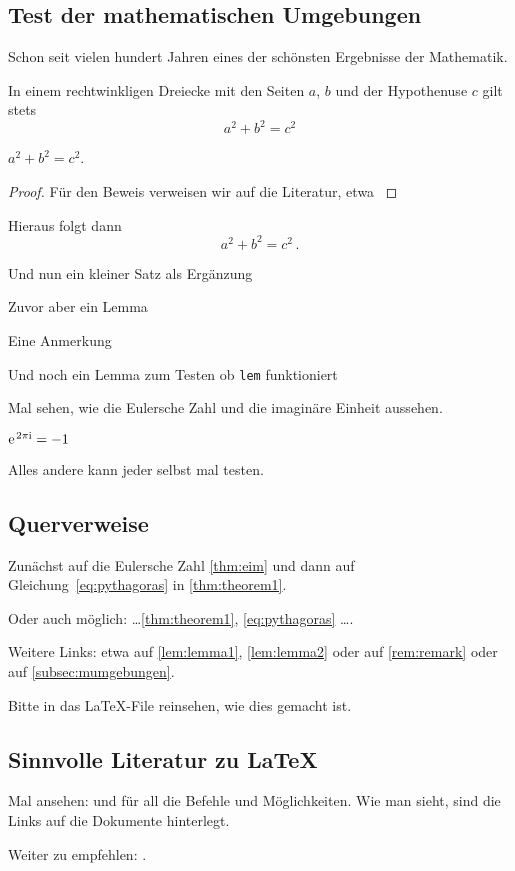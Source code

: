 \subsection{Test der mathematischen Umgebungen}\label{subsec:mumgebungen}
Schon seit vielen hundert Jahren eines der schönsten Ergebnisse der Mathematik.
%
\begin{theorem}\label{thm:theorem1}
In einem rechtwinkligen Dreiecke mit den Seiten $ a $, $ b $ und der Hypothenuse $ c $ gilt stets
\begin{equation}\label{eq:pythagoras}
a^{ 2 } +b^{ 2 } = c^{ 2 }
\end{equation}

$	a^{ 2 } +b^{ 2 } = c^{ 2 } $.
\end{theorem}
%
\begin{proof}
Für den Beweis verweisen wir auf die Literatur, etwa \textcite{efhn:2016}
\end{proof}
\begin{corollary}\label{cor:folgerung}
Hieraus folgt dann 
%
\[
	a^{ 2 } + b^{ 2 } = c^{ 2 } \, .
\]
%
\end{corollary}
%
\begin{proposition}\label{prop:prop}
Und nun ein kleiner Satz als Ergänzung 
\end{proposition}
%
\begin{lemma}\label{lem:lemma1}
Zuvor aber ein Lemma
\end{lemma}
%
\begin{remark}\label{rem:remark}
Eine Anmerkung
\end{remark}
\begin{lem}\label{lem:lemma2}
Und noch ein Lemma zum Testen ob \texttt{lem} funktioniert
\end{lem}
Mal sehen, wie die Eulersche Zahl und die imaginäre Einheit aussehen.
\begin{theorem}\label{thm:eim}
$ \mathrm{e\;\!}^{ 2 \pi \mathrm{i} } = -1 $
\end{theorem}
Alles andere kann jeder selbst mal testen.
%
\subsection{Querverweise}\label{subsec:referenzen}
%
Zunächst auf die Eulersche Zahl \vref{thm:eim} und dann auf Gleichung~\eqref{eq:pythagoras} in \vref{thm:theorem1}.

Oder auch möglich: \ldots \cref{thm:theorem1}, \vref{eq:pythagoras} \ldots.

Weitere Links: etwa auf \vref{lem:lemma1}, \vref{lem:lemma2} oder auf \vref{rem:remark} oder auf \vref{subsec:mumgebungen}.

Bitte in das \LaTeX-File reinsehen, wie dies gemacht ist.
%
\subsection{Sinnvolle Literatur zu \LaTeX}
%
Mal ansehen: \textcite{l2tabu} und \textcite{lshort-german} \bzw \textcite{latex-refsheet} für all die Befehle und Möglichkeiten.
Wie man sieht, sind die Links auf die Dokumente hinterlegt.

Weiter zu empfehlen: \textcite{graetzer:2007}.

